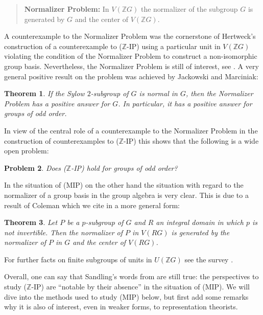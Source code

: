\documentclass[11pt, a4paper]{amsart}
\newtheorem{theorem}{Theorem}[section]
\newtheorem{problem}[theorem]{Problem}
\theoremstyle{definition}
\begin{document}
\begin{quote}\textbf{Normalizer Problem:} 
In $V(\mathbb{Z}G)$ the normalizer of the subgroup $G$ is generated by $G$ and the center of $V(\mathbb{Z}G)$.
\end{quote}

A counterexample to the Normalizer Problem was the cornerstone of Hertweck's construction of a counterexample to ($\mathbb{Z}$-IP) using a particular unit in $V(\mathbb{Z}G)$ violating the condition of the Normalizer Problem to construct a non-isomorphic group basis. Nevertheless, the Normalizer Problem is still of interest, see \cite{VanAntwerpen}. A very general positive result on the problem was achieved by Jackowski and Marciniak:

\begin{theorem} \cite{JackowskiMarciniak87}
If the Sylow $2$-subgroup of $G$ is normal in $G$, then the Normalizer Problem has a positive answer for $G$. In particular, it has a positive answer for groups of odd order.	
\end{theorem}

In view of the central role of a counterexample to the Normalizer Problem in the construction of counterexamples to ($\mathbb{Z}$-IP) this shows that the following is a wide open problem:

\begin{problem}
Does ($\mathbb{Z}$-IP) hold for groups of odd order?
\end{problem}

In the situation of (MIP) on the other hand the situation with regard to the normalizer of a group basis in the group algebra is very clear. This is due to a result of Coleman \cite{Coleman64} which we cite in a more general form:

\begin{theorem}\label{th:ColemanLemma}\cite[2.1 Lemma]{RoggenkampTaylor}
Let $P$ be a $p$-subgroup of $G$ and $R$ an integral domain in which $p$ is not invertible. Then the normalizer of $P$ in $V(RG)$ is generated by the normalizer of $P$ in $G$ and the center of $V(RG)$.
\end{theorem}

For further facts on finite subgroups of units in $U(\mathbb{Z}G)$ see the survey \cite{MargolisDelRioSurvey}.

Overall, one can say that Sandling's words from \cite{SandlingSurvey} are still true: the perspectives to study ($\mathbb{Z}$-IP) are ``notable by their absence'' in the situation of (MIP). We will dive into the methods used to study (MIP) below, but first add some remarks why it is also of interest, even in weaker forms, to representation theorists.
\end{document}
